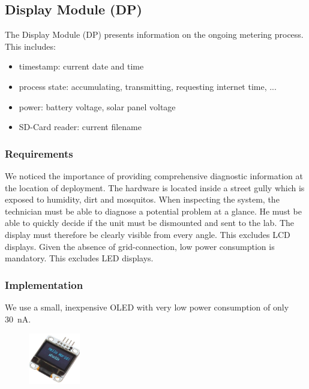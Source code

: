 \subsection{Display Module (DP) }
\label{sec:DP}
The Display Module (DP) presents information on the ongoing metering process. This includes:

\begin{itemize}
    \item timestamp: current date and time
    \item process state: accumulating, transmitting, requesting internet time, ...
    \item power: battery voltage, solar panel voltage
    \item SD-Card reader: current filename
\end{itemize}

\subsubsection{Requirements}
We noticed the importance of providing comprehensive diagnostic information at the location of deployment.
The hardware is located inside a street gully which is exposed to humidity, dirt and mosquitos. When inspecting the system, the technician
must be able to diagnose a potential problem at a glance. He must be able to quickly decide if the unit must be dismounted and sent to the lab.
The display must therefore be clearly visible from every angle. This excludes LCD displays.
Given the absence of grid-connection, low power consumption is mandatory. This excludes LED displays.

\subsubsection{Implementation}
We use a small,
inexpensive OLED with very low power consumption of only \qty{30}{\nA}.
\begin{figure}[h]
    \centering
    \includegraphics[width=0.2\textwidth]{MA/DP/DP}

\end{figure}


